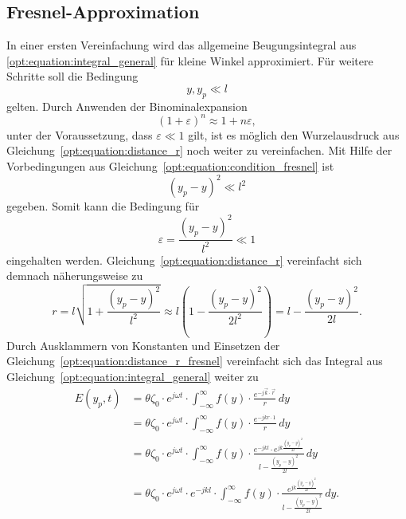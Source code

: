 \subsection{Fresnel-Approximation}
\label{opt:sec:fresnel}
In einer ersten Vereinfachung wird das allgemeine Beugungsintegral aus \ref{opt:equation:integral_general} für kleine Winkel approximiert.
Für weitere Schritte soll die Bedingung
\begin{equation}
y, y_p
\ll
l
\label{opt:equation:condition_fresnel}
\end{equation}
gelten.
Durch Anwenden der Binominalexpansion
\begin{equation}
(1 + \varepsilon)^n
\approx
1 + n\varepsilon
,
\end{equation}
unter der Voraussetzung, dass $\varepsilon \ll 1$ gilt, ist es möglich den Wurzelausdruck aus Gleichung~\ref{opt:equation:distance_r} noch weiter zu vereinfachen.
Mit Hilfe der Vorbedingungen aus Gleichung~\ref{opt:equation:condition_fresnel} ist
\begin{equation}
(y_p-y)^2
\ll
l^2
\end{equation}
gegeben.
Somit kann die Bedingung für
\begin{equation}
\varepsilon
=
\frac{(y_p-y)^2}{l^2}
\ll
1
\label{opt:equation:condition_epsilon}
\end{equation}
eingehalten werden.
Gleichung~\ref{opt:equation:distance_r} vereinfacht sich demnach näherungsweise zu
\begin{equation}
r
=
l \sqrt{1 + \frac{(y_p-y)^2}{l^2}}
\approx
l \left(1 - \frac{(y_p-y)^2}{2l^2}\right)
=
l - \frac{(y_p-y)^2}{2l}
.
\label{opt:equation:distance_r_fresnel}
\end{equation}
Durch Ausklammern von Konstanten und Einsetzen der Gleichung~\ref{opt:equation:distance_r_fresnel} vereinfacht sich das Integral aus Gleichung~\ref{opt:equation:integral_general} weiter zu
\begin{align}
E(y_p, t)
&=
\theta\zeta_0 \cdot e^{j\omega t} \cdot \int_{-\infty}^{\infty}f(y)\cdot\frac{e^{-j\vec{k}\cdot\vec{r}}}{r} \,dy
\\
&=
\theta\zeta_0 \cdot e^{j\omega t} \cdot \int_{-\infty}^{\infty}f(y)\cdot\frac{e^{-jkr \cdot 1}}{r} \,dy
\\
&=
\theta\zeta_0 \cdot e^{j\omega t} \cdot \int_{-\infty}^{\infty}f(y)\cdot\frac{e^{-jkl} \cdot e^{jk\frac{(y_p-y)^2}{2l}}}{l - \frac{(y_p-y)^2}{2l}} \,dy
\\
&=
\theta\zeta_0 \cdot e^{j\omega t} \cdot e^{-jkl} \cdot \int_{-\infty}^{\infty}f(y)\cdot\frac{e^{jk\frac{(y_p-y)^2}{2l}}}{l - \frac{(y_p-y)^2}{2l}} \,dy
.
\end{align}
